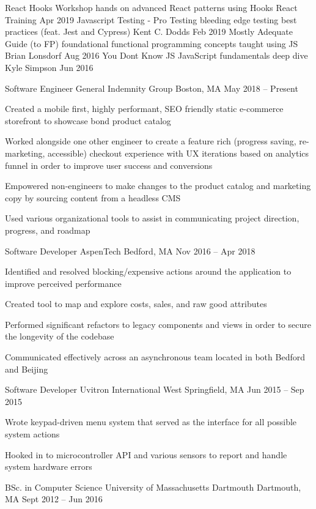 \documentclass[]{awesome-cv}
\begin{document}
\vspace{-7mm}
\begin{cvhonors}
	\cvhonor
	{React Hooks Workshop}
	{hands on advanced React patterns using Hooks}
	{React Training}
	{Apr 2019}
	\cvhonor
	{Javascript Testing - Pro Testing}
	{bleeding edge testing best practices (feat. Jest and Cypress)}
	{Kent C. Dodds}
	{Feb 2019}
	\cvhonor
	{Mostly Adequate Guide (to FP)}
	{foundational functional programming concepts taught using JS}
	{Brian Lonsdorf}
	{Aug 2016}
	\cvhonor
	{You Don\textquotesingle{}t Know JS}
	{JavaScript fundamentals deep dive}
	{Kyle Simpson}
	{Jun 2016}
\end{cvhonors}
\begin{cventries}
	\cventry
	{Software Engineer}
	{General Indemnity Group}
	{Boston, MA}
	{May 2018 – Present}
	{\begin{cvitems}
		\item {Created a mobile first, highly performant, SEO friendly static e-commerce storefront to showcase bond product catalog}
		\item {Worked alongside one other engineer to create a feature rich (progress saving, re-marketing, accessible) checkout experience with UX iterations based on analytics funnel in order to improve user success and conversions}
		\item {Empowered non-engineers to make changes to the product catalog and marketing copy by sourcing content from a headless CMS}
		\item {Used various organizational tools to assist in communicating project direction, progress, and roadmap}
		\end{cvitems}}
	\cventry
	{Software Developer}
	{AspenTech}
	{Bedford, MA}
	{Nov 2016 – Apr 2018}
	{\begin{cvitems}
		\item {Identified and resolved blocking/expensive actions around the application to improve perceived performance}
		\item {Created tool to map and explore costs, sales, and raw good attributes}
		\item {Performed significant refactors to legacy components and views in order to secure the longevity of the codebase}
		\item {Communicated effectively across an asynchronous team located in both Bedford and Beijing}
		\end{cvitems}}
	\cventry
	{Software Developer}
	{Uvitron International}
	{West Springfield, MA}
	{Jun 2015 – Sep 2015}
	{\begin{cvitems}
		\item {Wrote keypad-driven menu system that served as the interface for all possible system actions}
		\item {Hooked in to microcontroller API and various sensors to report and handle system hardware errors}
		\end{cvitems}}
\end{cventries}
\begin{cventries}
	\cventry
	{BSc. in Computer Science}
	{University of Massachusetts Dartmouth}
	{Dartmouth, MA}
	{Sept 2012 – Jun 2016}
	{}
\end{cventries}

\vspace{-2mm}
\ 
\end{document}
